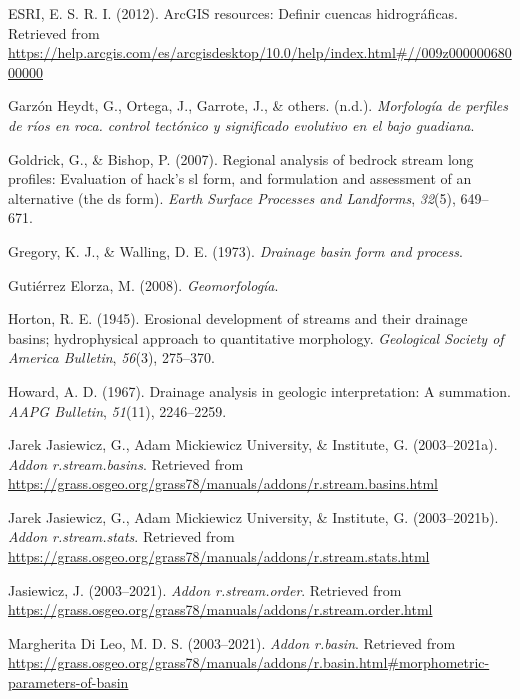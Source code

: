 \documentclass[11pt,]{article}
\begin{document}
\hypertarget{ref-ESRI2012}{}
ESRI, E. S. R. I. (2012). ArcGIS resources: Definir cuencas
hidrográficas. Retrieved from
\url{https://help.arcgis.com/es/arcgisdesktop/10.0/help/index.html\#//009z00000068000000}

\hypertarget{ref-garzonmorfologia}{}
Garzón Heydt, G., Ortega, J., Garrote, J., \& others. (n.d.).
\emph{Morfología de perfiles de ríos en roca. control tectónico y
significado evolutivo en el bajo guadiana}.

\hypertarget{ref-goldrick2007regional}{}
Goldrick, G., \& Bishop, P. (2007). Regional analysis of bedrock stream
long profiles: Evaluation of hack's sl form, and formulation and
assessment of an alternative (the ds form). \emph{Earth Surface
Processes and Landforms}, \emph{32}(5), 649--671.

\hypertarget{ref-gregory1973drainage}{}
Gregory, K. J., \& Walling, D. E. (1973). \emph{Drainage basin form and
process}.

\hypertarget{ref-gutierrez2008geomorfologia}{}
Gutiérrez Elorza, M. (2008). \emph{Geomorfología}.

\hypertarget{ref-horton1945erosional}{}
Horton, R. E. (1945). Erosional development of streams and their
drainage basins; hydrophysical approach to quantitative morphology.
\emph{Geological Society of America Bulletin}, \emph{56}(3), 275--370.

\hypertarget{ref-howard1967drainage}{}
Howard, A. D. (1967). Drainage analysis in geologic interpretation: A
summation. \emph{AAPG Bulletin}, \emph{51}(11), 2246--2259.

\hypertarget{ref-streambasinsjareck}{}
Jarek Jasiewicz, G., Adam Mickiewicz University, \& Institute, G.
(2003--2021a). \emph{Addon r.stream.basins}. Retrieved from
\url{https://grass.osgeo.org/grass78/manuals/addons/r.stream.basins.html}

\hypertarget{ref-streamstats}{}
Jarek Jasiewicz, G., Adam Mickiewicz University, \& Institute, G.
(2003--2021b). \emph{Addon r.stream.stats}. Retrieved from
\url{https://grass.osgeo.org/grass78/manuals/addons/r.stream.stats.html}

\hypertarget{ref-streamorder}{}
Jasiewicz, J. (2003--2021). \emph{Addon r.stream.order}. Retrieved from
\url{https://grass.osgeo.org/grass78/manuals/addons/r.stream.order.html}

\hypertarget{ref-basinmargherita}{}
Margherita Di Leo, M. D. S. (2003--2021). \emph{Addon r.basin}.
Retrieved from
\url{https://grass.osgeo.org/grass78/manuals/addons/r.basin.html\#morphometric-parameters-of-basin}
\end{document}
